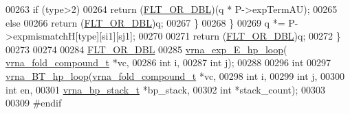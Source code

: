 \begin{DoxyCode}
00263       \textcolor{keywordflow}{if} (type>2)
00264         \textcolor{keywordflow}{return} (\hyperlink{group__data__structures_ga31125aeace516926bf7f251f759b6126}{FLT\_OR\_DBL})(q * P->expTermAU);
00265       \textcolor{keywordflow}{else}
00266         \textcolor{keywordflow}{return} (\hyperlink{group__data__structures_ga31125aeace516926bf7f251f759b6126}{FLT\_OR\_DBL})q;
00267     \}
00268   \}
00269   q *= P->expmismatchH[type][si1][sj1];
00270 
00271   \textcolor{keywordflow}{return} (\hyperlink{group__data__structures_ga31125aeace516926bf7f251f759b6126}{FLT\_OR\_DBL})q;
00272 \}
00273 
00274 
00284 \hyperlink{group__data__structures_ga31125aeace516926bf7f251f759b6126}{FLT\_OR\_DBL}
00285 \hyperlink{group__loops_gac9f49b31d3ec1d9040798b05506c71da}{vrna\_exp\_E\_hp\_loop}( \hyperlink{group__fold__compound_structvrna__fc__s}{vrna\_fold\_compound\_t} *vc,
00286                     \textcolor{keywordtype}{int} i,
00287                     \textcolor{keywordtype}{int} j);
00288 
00296 \textcolor{keywordtype}{int}
00297 \hyperlink{group__loops_ga6c4ba14d24f716d0ca9021771357e903}{vrna\_BT\_hp\_loop}(\hyperlink{group__fold__compound_structvrna__fc__s}{vrna\_fold\_compound\_t} *vc,
00298                 \textcolor{keywordtype}{int} i,
00299                 \textcolor{keywordtype}{int} j,
00300                 \textcolor{keywordtype}{int} en,
00301                 \hyperlink{group__data__structures_structvrna__bp__stack__s}{vrna\_bp\_stack\_t} *bp\_stack,
00302                 \textcolor{keywordtype}{int}   *stack\_count);
00303 
00309 \textcolor{preprocessor}{#endif}
\end{DoxyCode}
